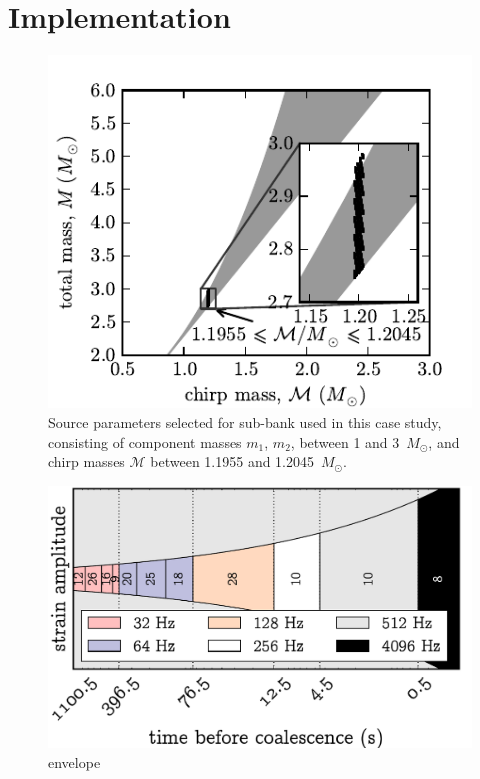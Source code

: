 \documentclass[portrait,plainboxedsections]{sciposter}
\begin{document}
\begin{minipage}[t]{0.25\textwidth}

\section*{Implementation}

\begin{figure}[h]
	\includegraphics{figures/tmpltbank}
	\caption{\label{fig:tmpltbank}Source parameters selected for sub-bank used in this
case study, consisting of component masses $m_1$, $m_2$, between 1 and 3~$M_\odot$, and
chirp masses $\mathcal{M}$ between 1.1955 and 1.2045~$M_\odot$.}
\end{figure}

\begin{figure}
\includegraphics{figures/envelope}
\caption{envelope}
\end{figure}


\end{minipage}
\end{document}
